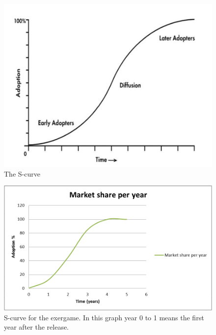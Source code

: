 \begin{figure}
\begin{center}
\includegraphics[scale=0.4]{scurve}
\caption[The S-curve]{The S-curve \cite{scurve}}
\label{fig:scurve}
\end{center}
\end{figure}
\begin{figure}
\begin{center}
\includegraphics[scale=0.5]{scurve2}
\caption[The S-curve for the exergame]{S-curve for the exergame. In this graph year 0 to 1 means the first year after the release.}
\label{fig:scurve2}
\end{center}
\end{figure}
